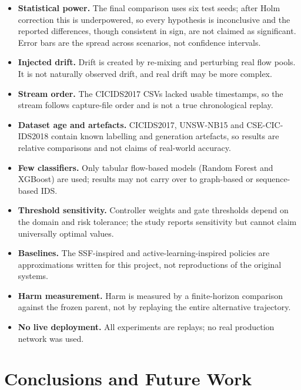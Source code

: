 \documentclass{article}
\begin{document}
\begin{itemize}
\item \textbf{Statistical power.} The final comparison uses six test seeds; after Holm correction this is underpowered, so every hypothesis is inconclusive and the reported differences, though consistent in sign, are not claimed as significant. Error bars are the spread across scenarios, not confidence intervals.
\item \textbf{Injected drift.} Drift is created by re-mixing and perturbing real flow pools. It is not naturally observed drift, and real drift may be more complex.
\item \textbf{Stream order.} The CICIDS2017 CSVs lacked usable timestamps, so the stream follows capture-file order and is not a true chronological replay.
\item \textbf{Dataset age and artefacts.} CICIDS2017, UNSW-NB15 and CSE-CIC-IDS2018 contain known labelling and generation artefacts, so results are relative comparisons and not claims of real-world accuracy.
\item \textbf{Few classifiers.} Only tabular flow-based models (Random Forest and XGBoost) are used; results may not carry over to graph-based or sequence-based IDS.
\item \textbf{Threshold sensitivity.} Controller weights and gate thresholds depend on the domain and risk tolerance; the study reports sensitivity but cannot claim universally optimal values.
\item \textbf{Baselines.} The SSF-inspired and active-learning-inspired policies are approximations written for this project, not reproductions of the original systems.
\item \textbf{Harm measurement.} Harm is measured by a finite-horizon comparison against the frozen parent, not by replaying the entire alternative trajectory.
\item \textbf{No live deployment.} All experiments are replays; no real production network was used.
\end{itemize}

\pagebreak
\section{Conclusions and Future Work}
\end{document}
